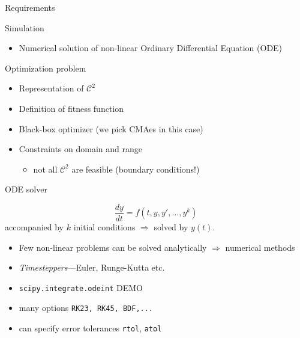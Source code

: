 \documentclass[presentation]{beamer}
\begin{document}
\begin{frame}[label={sec:org809f218}]{Requirements}
\begin{alertblock}{Simulation}
\begin{itemize}
\item \alert{Numerical solution} of non-linear Ordinary Differential Equation (ODE)
\end{itemize}
\end{alertblock}
\begin{alertblock}{Optimization problem}
\begin{itemize}
\item \alert{Representation} of \(\mathcal{C}^2\)
\item Definition of \alert{fitness function}
\item Black-box \alert{optimizer} (we pick CMAes in this case)
\item \alert{Constraints} on domain and range
\begin{itemize}
\item not all \(\mathcal{C}^2\) are feasible (boundary conditions!)
\end{itemize}
\end{itemize}
\end{alertblock}
\end{frame}
\begin{frame}[label={sec:orgccf965a},fragile]{ODE solver}
 \begin{definition}
\[ \frac{dy}{dt} = f(t, y, y', \dots, y^{k})\]
accompanied by \(k\) initial conditions \(\Rightarrow\) solved by \(y(t)\).
\begin{itemize}
\item Few non-linear problems can be solved analytically \(\Rightarrow\) \alert{numerical methods}
\item \emph{Timesteppers}---Euler, Runge-Kutta etc.
\end{itemize}
\end{definition}
\begin{example}
\begin{itemize}
\item \texttt{scipy.integrate.odeint} \alert{DEMO}
\item many options \texttt{RK23, RK45, BDF,...}
\item can specify error tolerances \texttt{rtol}, \texttt{atol}
\end{itemize}
\end{example}
\end{frame}
\end{document}

